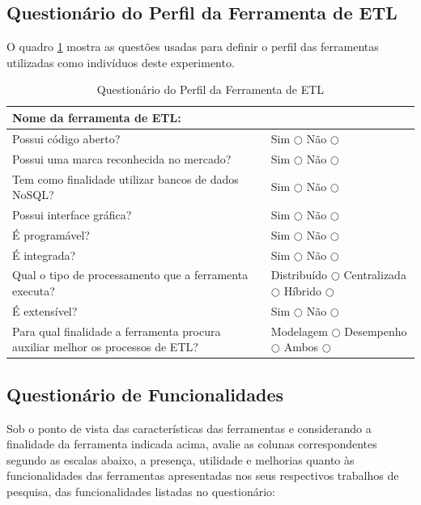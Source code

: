 \subsection{Questionário do Perfil da Ferramenta de ETL}

O quadro \ref{questionarioperfil} mostra as questões usadas para definir o perfil das ferramentas utilizadas como indivíduos deste experimento.

\begin{table}[ht]
	\centering
	\caption{Questionário do Perfil da Ferramenta de ETL}
	\label{questionarioperfil}
	\begin{tabular}{|p{8cm}| p{8cm}| }
		\hline
		Nome da ferramenta de ETL: & \\
		\hline
		Possui código aberto? & Sim $\bigcirc$ Não $\bigcirc$ \\
		\hline
		Possui uma marca reconhecida no mercado? & Sim $\bigcirc$ Não $\bigcirc$ \\
		\hline
		Tem como finalidade utilizar bancos de dados NoSQL? &  Sim $\bigcirc$ Não $\bigcirc$ \\
		\hline
		Possui interface gráfica? & Sim $\bigcirc$ Não $\bigcirc$ \\
		\hline
		É programável?  & Sim $\bigcirc$ Não $\bigcirc$ \\
		\hline
		É integrada? & Sim $\bigcirc$ Não $\bigcirc$ \\
		\hline
		Qual o tipo de processamento que a ferramenta executa? & Distribuído  $\bigcirc$  Centralizada  $\bigcirc$  Híbrido  $\bigcirc$ \\
		\hline
		É extensível? & Sim $\bigcirc$ Não $\bigcirc$ \\
		\hline
		Para qual finalidade a ferramenta procura auxiliar melhor os processos de ETL? & Modelagem $\bigcirc$ Desempenho $\bigcirc$ Ambos $\bigcirc$ \\
		\hline
		
		
	\end{tabular}
\end{table}


\subsection{Questionário de Funcionalidades}

Sob o ponto de vista das características das ferramentas e considerando a finalidade da ferramenta indicada acima, avalie as colunas correspondentes segundo as escalas abaixo, a presença, utilidade e melhorias quanto às funcionalidades das ferramentas apresentadas nos seus respectivos trabalhos de pesquisa, das funcionalidades listadas no questionário:

